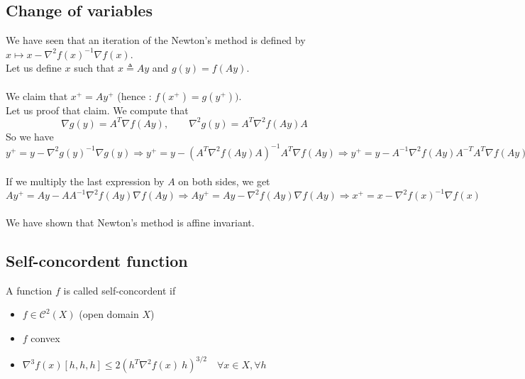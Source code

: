 \subsection{Change of variables}
We have seen that an iteration of the Newton's method is defined by $x \longmapsto x - \nabla^2f(x)^{-1}\nabla f(x)$. \\
Let us define $x$ such that $x \triangleq Ay$ and $g(y) = f(Ay)$. \\ \\
We claim that $x^+ = Ay^+$ (hence : $f(x^+) = g(y^+))$. \\
Let us proof that claim. We compute that
$$ \nabla g(y) = A^T \nabla f(Ay), \qquad \nabla^2 g(y) = A^T \nabla^2 f(Ay) A$$
So we have \\
$y^+ = y - \nabla^2 g(y)^{-1}\nabla g(y) \Longrightarrow y^+ = y - (A^T \nabla^2 f(Ay) A)^{-1} A^T \nabla f(Ay) \Longrightarrow y^+ = y - A^{-1} \nabla^2 f(Ay) A^{-T} A^T \nabla f(Ay)$ \\ \\
If we multiply the last expression by $A$ on both sides, we get \\
$ Ay^+ = Ay - AA^{-1} \nabla^2 f(Ay) \nabla f(Ay) \Longrightarrow Ay^+ = Ay - \nabla^2 f(Ay) \nabla f(Ay) \Longrightarrow x^+ = x - \nabla^2 f(x)^{-1} \nabla f(x)$ \\ \\
We have shown that Newton's method is affine invariant.

\subsection{Self-concordent function}
\begin{definition} A function $f$ is called self-concordent if 
\begin{itemize}
\item $f \in \mathcal{C}^2(X)$ (open domain $X$)
\item $f$ convex
\item $\nabla^3 f(x) [h,h,h] \leq 2 (h^T \nabla^2 f(x)\ h)^{3/2} \quad \forall x \in X, \forall h$
\end{itemize}
\end{definition}
% 